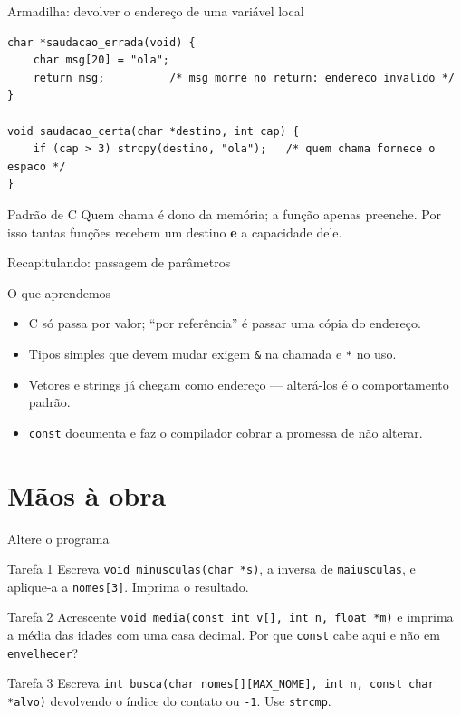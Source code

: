 \documentclass[aspectratio=169]{beamer}
\begin{document}
\begin{frame}[fragile]{Armadilha: devolver o endereço de uma variável local}
\begin{lstlisting}[numbers=none]
char *saudacao_errada(void) {
    char msg[20] = "ola";
    return msg;          /* msg morre no return: endereco invalido */
}

void saudacao_certa(char *destino, int cap) {
    if (cap > 3) strcpy(destino, "ola");   /* quem chama fornece o espaco */
}
\end{lstlisting}
  \begin{alertblock}{Padrão de C}
    Quem chama é dono da memória; a função apenas preenche. Por isso tantas
    funções recebem um destino \textbf{e} a capacidade dele.
  \end{alertblock}
\end{frame}

\begin{frame}{Recapitulando: passagem de parâmetros}
  \begin{block}{O que aprendemos}
    \begin{itemize}
      \item C só passa por valor; ``por referência'' é passar uma cópia do
            endereço.
      \item Tipos simples que devem mudar exigem \texttt{\&} na chamada e
            \texttt{*} no uso.
      \item Vetores e strings já chegam como endereço --- alterá-los é o
            comportamento padrão.
      \item \texttt{const} documenta e faz o compilador cobrar a promessa de
            não alterar.
    \end{itemize}
  \end{block}
\end{frame}

\section{Mãos à obra}

\begin{frame}{Altere o programa}
  \begin{block}{Tarefa 1}
    Escreva \texttt{void minusculas(char *s)}, a inversa de \texttt{maiusculas},
    e aplique-a a \texttt{nomes[3]}. Imprima o resultado.
  \end{block}
  \begin{block}{Tarefa 2}
    Acrescente \texttt{void media(const int v[], int n, float *m)} e imprima a
    média das idades com uma casa decimal. Por que \texttt{const} cabe aqui e
    não em \texttt{envelhecer}?
  \end{block}
  \begin{block}{Tarefa 3}
    Escreva \texttt{int busca(char nomes[][MAX\_NOME], int n, const char *alvo)}
    devolvendo o índice do contato ou \texttt{-1}. Use \texttt{strcmp}.
  \end{block}
\end{frame}
\end{document}
